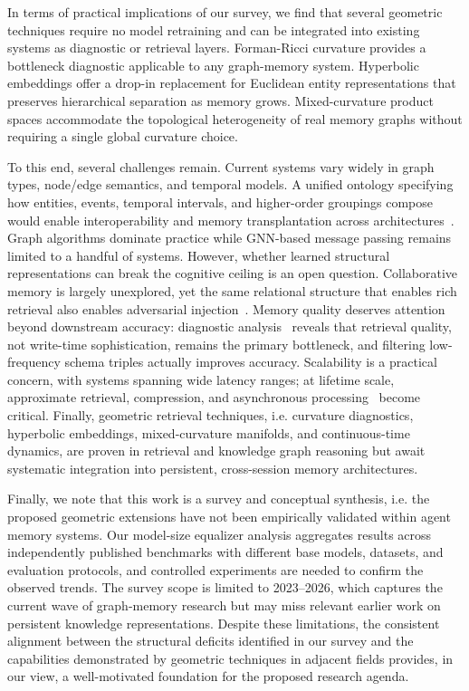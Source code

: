 \documentclass[hf]{ceurart}
\begin{document}
In terms of practical implications of our survey, we find that several geometric techniques require no model retraining and can be
integrated into existing systems as diagnostic or retrieval layers.
Forman-Ricci curvature provides a bottleneck diagnostic
applicable to any graph-memory system. Hyperbolic embeddings offer a
drop-in replacement for Euclidean entity representations that
preserves hierarchical separation as memory grows. Mixed-curvature
product spaces accommodate the topological heterogeneity of real
memory graphs without requiring a single global curvature choice.

To this end, several challenges remain. Current systems vary widely in graph types,
node/edge semantics, and temporal models. A unified ontology specifying
how entities, events, temporal intervals, and higher-order groupings
compose would enable interoperability and memory transplantation across
architectures~\cite{transplants2026}. Graph algorithms dominate
practice while GNN-based message passing remains limited to a handful
of systems. However, whether learned structural representations can break the
cognitive ceiling is an open question. Collaborative memory is largely
unexplored, yet the same relational structure that enables rich
retrieval also enables adversarial
injection~\cite{minja2026,collabormem2025,damcs2025}. Memory quality
deserves attention beyond downstream accuracy: diagnostic
analysis~\cite{diagnosebottleneck2026} reveals that retrieval quality,
not write-time sophistication, remains the primary bottleneck, and
filtering low-frequency schema triples actually improves accuracy.
Scalability is a practical concern, with systems spanning wide latency
ranges; at lifetime scale, approximate retrieval, compression, and
asynchronous processing~\cite{comem2026} become critical. Finally,
geometric retrieval techniques, i.e. curvature diagnostics, hyperbolic
embeddings, mixed-curvature manifolds, and continuous-time
dynamics, are proven in retrieval and knowledge graph reasoning but
await systematic integration into persistent, cross-session memory
architectures.

Finally, we note that this work is a survey and conceptual synthesis, i.e. the proposed geometric
extensions have not been empirically validated within agent memory
systems. Our model-size equalizer analysis aggregates results across
independently published benchmarks with different base models,
datasets, and evaluation protocols, and controlled experiments are
needed to confirm the observed trends. The survey scope is limited to
2023--2026, which captures the current wave of graph-memory research
but may miss relevant earlier work on persistent knowledge
representations. Despite these limitations, the consistent alignment
between the structural deficits identified in our survey and the
capabilities demonstrated by geometric techniques in adjacent
fields provides, in our view, a well-motivated foundation for the
proposed research agenda.
\end{document}
